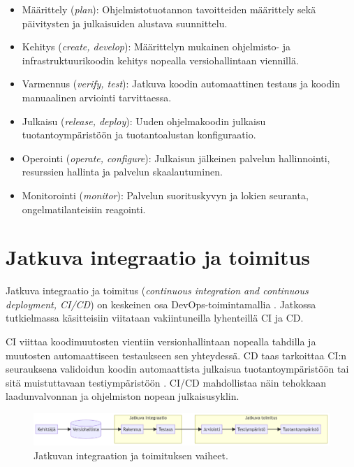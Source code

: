 \begin{itemize}
\item Määrittely (\textit{plan}): Ohjelmistotuotannon tavoitteiden määrittely sekä päivitysten ja julkaisuiden alustava suunnittelu.
\item Kehitys (\textit{create, develop}): Määrittelyn mukainen ohjelmisto- ja infrastruktuurikoodin kehitys nopealla versiohallintaan viennillä.
\item Varmennus (\textit{verify, test}): Jatkuva koodin automaattinen testaus ja koodin manuaalinen arviointi tarvittaessa.
\item Julkaisu (\textit{release, deploy}): Uuden ohjelmakoodin julkaisu tuotantoympäristöön ja tuotantoalustan konfiguraatio.
\item Operointi (\textit{operate, configure}): Julkaisun jälkeinen palvelun hallinnointi, resurssien hallinta ja palvelun skaalautuminen.
\item Monitorointi (\textit{monitor}): Palvelun suorituskyvyn ja lokien seuranta, ongelmatilanteisiin reagointi.
\end{itemize}

\section{Jatkuva integraatio ja toimitus}

Jatkuva integraatio ja toimitus (\textit{continuous integration and continuous deployment, CI/CD}) on keskeinen osa DevOps-toimintamallia \cite{Jabbari16, Leite19}. Jatkossa tutkielmassa käsitteisiin viitataan vakiintuneilla lyhenteillä CI ja CD.

CI viittaa koodimuutosten vientiin versionhallintaan nopealla tahdilla ja muutosten automaattiseen testaukseen sen yhteydessä.
CD taas tarkoittaa CI:n seurauksena validoidun koodin automaattista julkaisua tuotantoympäristöön tai sitä muistuttavaan testiympäristöön \cite{Shahin17}.
CI/CD mahdollistaa näin tehokkaan laadunvalvonnan ja ohjelmiston nopean julkaisusyklin.

\begin{figure}[ht]
\begin{center}
\includegraphics[width=1\textwidth]{figures/cicd-pipeline.png}
\caption{Jatkuvan integraation ja toimituksen vaiheet.\label{fig:cicd}}
\end{center}
\end{figure}

